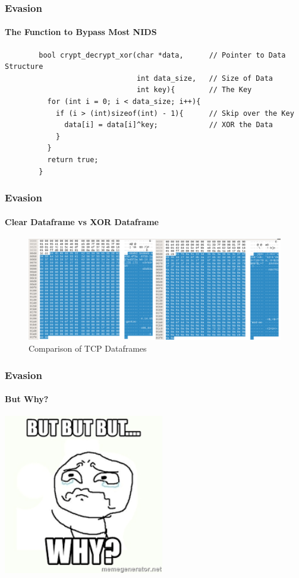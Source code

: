 \documentclass[aspectratio=169]{beamer}
\begin{document}
\begin{frame}[fragile]{}
  \frametitle{Evasion}
  \framesubtitle{The Function to Bypass Most NIDS}
  \begin{center}
    \begin{tcolorbox}[title=net.c,colback=black]
    \begin{minipage}{0.5\textwidth}
      \begin{verbatim}
        bool crypt_decrypt_xor(char *data,      // Pointer to Data Structure
                               int data_size,   // Size of Data
                               int key){        // The Key
          for (int i = 0; i < data_size; i++){ 
            if (i > (int)sizeof(int) - 1){      // Skip over the Key
              data[i] = data[i]^key;            // XOR the Data
            }
          }
          return true;
        }
      \end{verbatim}
    \end{minipage}
    \end{tcolorbox}
  \end{center}
\end{frame}

\begin{frame}
  \frametitle{Evasion}
  \framesubtitle{Clear Dataframe vs XOR Dataframe}
  \begin{center}
    \begin{figure}
      \includegraphics[width=14cm,keepaspectratio]{tcp_xor_dataframe}
      \caption{Comparison of TCP Dataframes}
    \end{figure}
  \end{center}
\end{frame}

\begin{frame}
  \frametitle{Evasion}
  \framesubtitle{But Why?}
  \begin{center}
    \includegraphics[width=7cm,keepaspectratio]{but_why}
  \end{center}
\end{frame}
\end{document}
